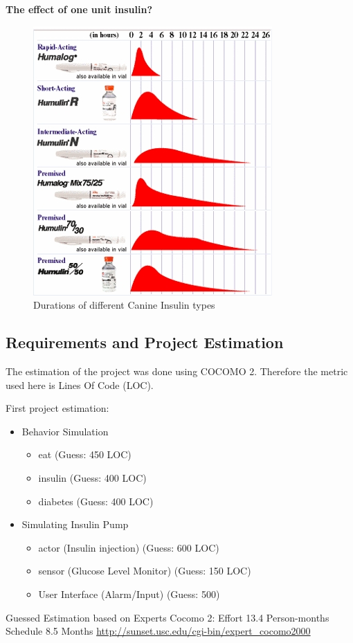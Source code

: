 \textbf{The effect of one unit insulin?}
\begin{figure}[htb]
\centering
\includegraphics[scale=1]{images/time_activity.jpg}
\caption{Durations of different Canine Insulin types}
\end{figure}

\subsection{Requirements and Project Estimation}
The estimation of the project was done using COCOMO 2.
Therefore the metric used here is Lines Of Code (LOC).

First project estimation:
\begin{itemize}
  \item Behavior Simulation
  	\begin{itemize}
        \item eat (Guess: 450 LOC)
        \item insulin (Guess: 400 LOC)
        \item diabetes (Guess: 400 LOC)
    \end{itemize}
  \item Simulating Insulin Pump
  	\begin{itemize}
        \item actor (Insulin injection) (Guess: 600 LOC)
        \item sensor (Glucose Level Monitor) (Guess: 150 LOC)
        \item User Interface (Alarm/Input) (Guess: 500)
    \end{itemize}
\end{itemize} 
Guessed Estimation based on Experts Cocomo 2:
Effort 13.4 Person-months
Schedule 8.5 Months
\url{http://sunset.usc.edu/cgi-bin/expert_cocomo2000}
